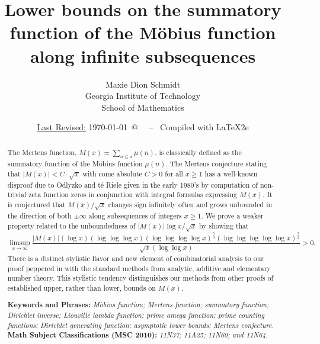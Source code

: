 \documentclass[11pt,reqno,a4letter]{article}
\title{
       \LARGE{
       Lower bounds on the summatory function of the M\"obius function along infinite subsequences 
       } 
}
\author{{\Large Maxie Dion Schmidt} \\ 
        {\normalsize Georgia Institute of Technology} \\[0.025cm] 
        {\normalsize School of Mathematics} 
}
\date{\small\underline{Last Revised:} \today \ @\ \hhmmsstime{} \ -- \ Compiled with \LaTeX2e}
\numberwithin{figure}{section}
\numberwithin{table}{section}
\theoremstyle{plain}
\numberwithin{theorem}{section}
\theoremstyle{definition}
\begin{document}
 

\maketitle

\begin{abstract} 
The Mertens function, $M(x) = \sum_{n \leq x} \mu(n)$, is classically 
defined as the summatory function of the M\"obius function $\mu(n)$. 
The Mertens conjecture stating that $|M(x)| < C \cdot \sqrt{x}$ with come absolute $C > 0$ for all 
$x \geq 1$ has a well-known disproof due to Odlyzko and t\'{e} Riele given in the early 1980's by computation of 
non-trivial zeta function zeros in conjunction with integral formulas expressing $M(x)$. 
It is conjectured that $M(x) / \sqrt{x}$ changes sign infinitely often and grows 
unbounded in the direction of both $\pm \infty$ along subsequences of integers $x \geq 1$. 
We prove a weaker property related to the unboundedness of $|M(x)| \log x /\sqrt{x}$ by showing that 
$$\limsup_{x \rightarrow \infty} \frac{|M(x)| (\log x) (\log\log\log x) (\log\log\log\log x)^{\frac{5}{4}} 
  (\log\log\log\log\log x)^{\frac{3}{2}}}{\sqrt{x} (\log\log x)} > 0.$$ 
There is a distinct stylistic 
flavor and new element of combinatorial analysis to our proof 
peppered in with the standard methods from analytic, additive and elementary number theory. 
This stylistic tendency distinguishes 
our methods from other proofs of established upper, rather than lower, bounds on $M(x)$. 

\bigskip 
\noindent
\textbf{Keywords and Phrases:} {\it M\"obius function; Mertens function; summatory function; 
                                    Dirichlet inverse; Liouville lambda function; prime omega function; 
                                    prime counting functions; Dirichlet generating function; 
                                    asymptotic lower bounds; Mertens conjecture. } \\ 
\textbf{Math Subject Classifications (MSC 2010):} {\it 11N37; 11A25; 11N60; and 11N64. } 
\end{abstract} 
\end{document}
